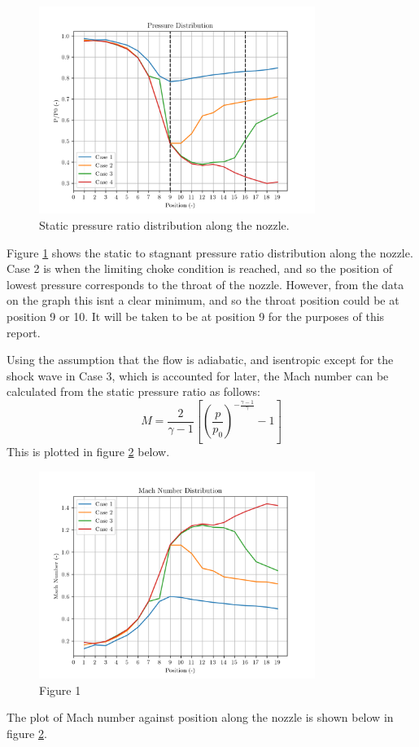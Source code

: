 \documentclass[8pt]{article}
\begin{document}
\begin{figure}[H]
    \centering
    \includegraphics[width=0.8\textwidth]{pressure_ratio_distribution_corrected.png}
    \caption{Static pressure ratio distribution along the nozzle.}
    \label{fig:figure4}
\end{figure}

Figure \ref{fig:figure4} shows the static to stagnant pressure ratio distribution along the nozzle.
Case 2 is when the limiting choke condition is reached, and so the position of lowest pressure corresponds to the throat of the nozzle.
However, from the data on the graph this isnt a clear minimum, and so the throat position could be at position 9 or 10.
It will be taken to be at position 9 for the purposes of this report.

Using the assumption that the flow is adiabatic, and isentropic except for the shock wave in Case 3, which is accounted for later, the Mach number can be calculated from the static pressure ratio as follows:
\begin{equation}
    M = \frac{2}{\gamma - 1} \left[ \left( \frac{p}{p_0} \right) ^ {-\frac{\gamma - 1}{\gamma}} - 1 \right]
\end{equation}
This is plotted in figure \ref{fig:figure5} below.

\begin{figure}[H]
    \centering
    \includegraphics[width=0.8\textwidth]{mach_number_distribution_corrected.png}
    \caption{Figure 1}
    \label{fig:figure5}
\end{figure}
The plot of Mach number against position along the nozzle is shown below in figure \ref{fig:figure5}.
\end{document}
